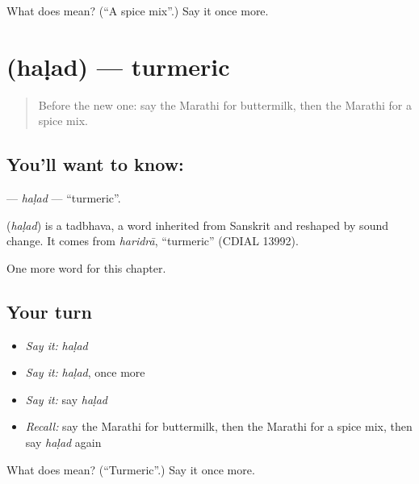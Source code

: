 \begin{tcolorbox}[breakable,colback=teal!4,colframe=teal!35!black,title={Before you move on}]
What does  mean? (\textquotedblleft{}A spice mix\textquotedblright{}.) Say it once more.
\end{tcolorbox}
\section[\texorpdfstring{\mr{हळद} (haḷad)}{हळद (haḷad)}]{ (haḷad) — turmeric}

\label{lesson:MR-C216-halad}



\begin{quote}
Before the new one: say the Marathi for buttermilk, then the Marathi for a spice mix.
\end{quote}

\subsection*{You'll want to know: }
\textbf{} — \emph{haḷad} — \textquotedblleft{}turmeric\textquotedblright{}.

\begin{cousinweb}
\textbf{} (\emph{haḷad}) is a tadbhava, a word inherited from Sanskrit and reshaped by sound change. It comes from \emph{haridrā}, \textquotedblleft{}turmeric\textquotedblright{} (CDIAL 13992).
\end{cousinweb}

\begin{grammarlens}[title={What you've built}]
One more word for this chapter.
\end{grammarlens}

\subsection*{Your turn}
\begin{itemize}
\raggedright
  \item \emph{Say it:} \emph{haḷad}
  \item \emph{Say it:} \emph{haḷad}, once more
  \item \emph{Say it:} say \emph{haḷad}
  \item \emph{Recall:} say the Marathi for buttermilk, then the Marathi for a spice mix, then say \emph{haḷad} again
\end{itemize}

\begin{tcolorbox}[breakable,colback=teal!4,colframe=teal!35!black,title={Before you move on}]
What does  mean? (\textquotedblleft{}Turmeric\textquotedblright{}.) Say it once more.
\end{tcolorbox}
